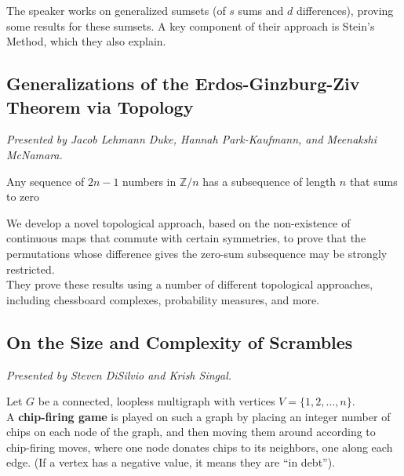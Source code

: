 \documentclass[12pt]{amsart}
\begin{document}
\begin{result*}
    The speaker works on generalized sumsets (of $s$ sums and $d$ differences), proving some results for these sumsets. A key component of their approach is Stein's Method, which they also explain.
\end{result*}

\vspace{2.5cm}

\subsection{Generalizations of the Erdos-Ginzburg-Ziv Theorem via Topology}

\textit{}

\vspace{0.25cm}
\textit{Presented by Jacob Lehmann Duke, Hannah Park-Kaufmann, and Meenakshi McNamara.}

\begin{theorem*}
Any sequence of $2n - 1$ numbers in $\mathbb{Z}/n$ has a subsequence of length $n$ that sums to zero
\end{theorem*}

\begin{result*}
    We develop a novel topological approach, based on the non-existence of continuous maps that commute with certain
    symmetries, to prove that the permutations whose difference gives the zero-sum subsequence
    may be strongly restricted. \\

    They prove these results using a number of different topological approaches, including chessboard complexes, probability measures, and more.
\end{result*}

\newpage

\subsection{On the Size and Complexity of Scrambles}

\textit{}

\vspace{0.25cm}
\textit{Presented by Steven DiSilvio and Krish Singal.}

\begin{definition}
Let $G$ be a connected, loopless multigraph with vertices $V = \{1, 2, \dots, n\}.$ \\

A \textbf{chip-firing game} is played on such a graph by placing an integer number of chips on each node of the graph, and then moving them around according to chip-firing moves, where one node donates chips to its neighbors, one along each edge. 
(If a vertex has a negative value, it means they are ``in debt'').\end{definition}
\end{document}
